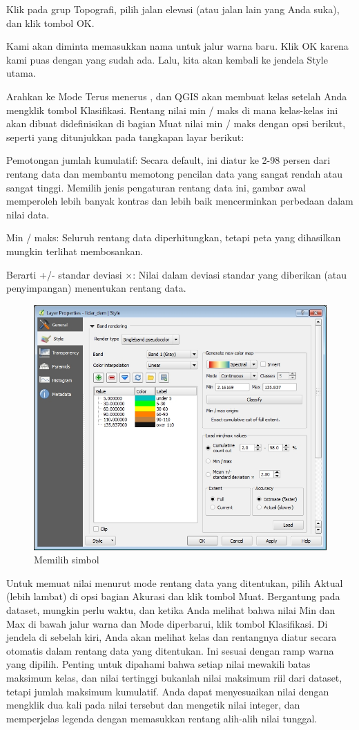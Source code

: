 \documentclass[]{book}
\begin{document}
Klik pada grup Topografi, pilih jalan elevasi (atau jalan lain yang Anda suka), dan klik tombol OK.

Kami akan diminta memasukkan nama untuk jalur warna baru. Klik OK karena kami puas dengan yang sudah ada. Lalu, kita akan kembali ke jendela Style utama.

Arahkan ke Mode \textbar{} Terus menerus , dan QGIS akan membuat kelas setelah Anda mengklik tombol Klasifikasi. Rentang nilai min / maks di mana kelas-kelas ini akan dibuat didefinisikan di bagian Muat nilai min / maks dengan opsi berikut, seperti yang ditunjukkan pada tangkapan layar berikut:

Pemotongan jumlah kumulatif:
Secara default, ini diatur ke 2-98 persen dari rentang data dan membantu memotong pencilan data yang sangat rendah atau sangat tinggi. Memilih jenis pengaturan rentang data ini, gambar awal memperoleh lebih banyak kontras dan lebih baik mencerminkan perbedaan dalam nilai data.

Min / maks:
Seluruh rentang data diperhitungkan, tetapi peta yang dihasilkan mungkin terlihat membosankan.

Berarti +/- standar deviasi ×:
Nilai dalam deviasi standar yang diberikan (atau penyimpangan) menentukan rentang data.

\begin{figure}

{\centering \includegraphics[width=0.3\linewidth]{images/09/fig912} 

}

\caption{Memilih simbol}\label{fig:fig912a}
\end{figure}

Untuk memuat nilai menurut mode rentang data yang ditentukan, pilih Aktual (lebih lambat) di opsi bagian Akurasi dan klik tombol Muat. Bergantung pada dataset, mungkin perlu waktu, dan ketika Anda melihat bahwa nilai Min dan Max di bawah jalur warna dan Mode diperbarui, klik tombol Klasifikasi. Di jendela di sebelah kiri, Anda akan melihat kelas dan rentangnya diatur secara otomatis dalam rentang data yang ditentukan. Ini sesuai dengan ramp warna yang dipilih. Penting untuk dipahami bahwa setiap nilai mewakili batas maksimum kelas, dan nilai tertinggi bukanlah nilai maksimum riil dari dataset, tetapi jumlah maksimum kumulatif. Anda dapat menyesuaikan nilai dengan mengklik dua kali pada nilai tersebut dan mengetik nilai integer, dan memperjelas legenda dengan memasukkan rentang alih-alih nilai tunggal.
\end{document}

